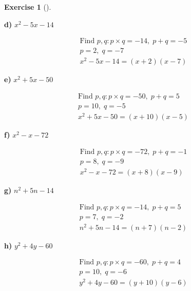 \documentclass[
  letterpaper,
  DIV=11,
  numbers=noendperiod]{scrreprt}
\theoremstyle{definition}
\newtheorem{exercise}{Exercise}[chapter]
\theoremstyle{remark}
\begin{document}
\begin{exercise}[]
\begin{tcolorbox}
\textbf{d)} \(\displaystyle x^2 - 5x - 14\)

\begin{align*}
\text{Find } p, q: p \times q = -14,\; p + q = -5 \\ p = 2,\; q = -7 \\ x^2 - 5x - 14 = (x + 2)(x - 7)
\end{align*}

\textbf{e)} \(\displaystyle x^2 + 5x - 50\)

\begin{align*}
\text{Find } p, q: p \times q = -50,\; p + q = 5 \\ p = 10,\; q = -5 \\ x^2 + 5x - 50 = (x + 10)(x - 5)
\end{align*}

\textbf{f)} \(\displaystyle x^2 - x - 72\)

\begin{align*}
\text{Find } p, q: p \times q = -72,\; p + q = -1 \\ p = 8,\; q = -9 \\ x^2 - x - 72 = (x + 8)(x - 9)
\end{align*}

\textbf{g)} \(\displaystyle n^2 + 5n - 14\)

\begin{align*}
\text{Find } p, q: p \times q = -14,\; p + q = 5 \\ p = 7,\; q = -2 \\ n^2 + 5n - 14 = (n + 7)(n - 2)
\end{align*}

\textbf{h)} \(\displaystyle y^2 + 4y - 60\)

\begin{align*}
\text{Find } p, q: p \times q = -60,\; p + q = 4 \\ p = 10,\; q = -6 \\ y^2 + 4y - 60 = (y + 10)(y - 6)
\end{align*}

\end{tcolorbox}

\end{exercise}
\end{document}
